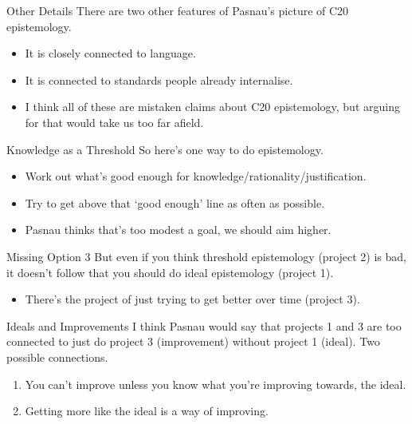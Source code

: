 \documentclass[
  17pt,
  letterpaper,
  ignorenonframetext,
  aspectratio=169,
  handout]{beamer}
\providecommand{\tightlist}{%
  \setlength{\itemsep}{0pt}\setlength{\parskip}{0pt}}\usepackage{longtable,booktabs,array}
\begin{document}
\begin{frame}{Other Details}
\protect\hypertarget{other-details}{}
There are two other features of Pasnau's picture of C20 epistemology.

\begin{itemize}[<+->]
\item
  It is closely connected to language.
\item
  It is connected to standards people already internalise.
\item
  I think all of these are mistaken claims about C20 epistemology, but
  arguing for that would take us too far afield.
\end{itemize}
\end{frame}

\begin{frame}{Knowledge as a Threshold}
\protect\hypertarget{knowledge-as-a-threshold}{}
So here's one way to do epistemology.

\begin{itemize}[<+->]
\tightlist
\item
  Work out what's good enough for knowledge/rationality/justification.
\item
  Try to get above that `good enough' line as often as possible.
\item
  Pasnau thinks that's too modest a goal, we should aim higher.
\end{itemize}
\end{frame}

\begin{frame}{Missing Option 3}
\protect\hypertarget{missing-option-3}{}
But even if you think threshold epistemology (project 2) is bad, it
doesn't follow that you should do ideal epistemology (project 1).

\begin{itemize}[<+->]
\tightlist
\item
  There's the project of just trying to get better over time (project
  3).
\end{itemize}
\end{frame}

\begin{frame}{Ideals and Improvements}
\protect\hypertarget{ideals-and-improvements}{}
I think Pasnau would say that projects 1 and 3 are too connected to just
do project 3 (improvement) without project 1 (ideal). Two possible
connections.

\begin{enumerate}[<+->]
\tightlist
\item
  You can't improve unless you know what you're improving towards, the
  ideal.
\item
  Getting more like the ideal is a way of improving.
\end{enumerate}
\end{frame}
\end{document}
